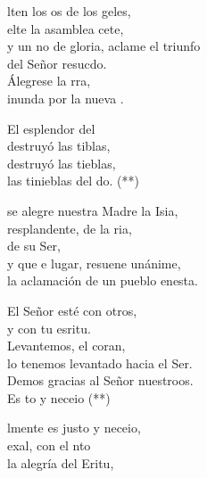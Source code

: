 \begin{cancion}%
	lten los os de los geles,\\
	elte la asamblea cete,\\
	y un no de gloria, aclame el triunfo\\
	del Señor resucdo.\\
	Álegrese la rra,\\
	inunda por la nueva .\jump\\
	\begin{chorus}%
		El esplendor del \\
		destruyó las tiblas,\\
		destruyó las tieblas,\\
		las tinieblas del do. (**)\jump\\
	\end{chorus}%
	 se alegre nuestra Madre la Isia,\\
	resplandente, de la ria,\\
	de su Ser,\\
	y que e lugar, resuene unánime,\\
	la aclamación de un pueblo enesta.\jump\\
	\begin{chorus}%
		El Señor esté con otros,\\
		y con tu esritu.\\
		Levantemos, el cora\chord{Mi}{7}{zó}n,\\
		lo tenemos levantado hacia el Se\chord{Mi}{7}{ño}r.\\
		Demos gracias al Señor nuestroos.\\
	\jump
		Es to y neceio (**)\jump\\
	\end{chorus}%
	lmente es justo y neceio,\\
	exal, con el nto \\
	la alegría del Eritu, \\

\end{cancion}
